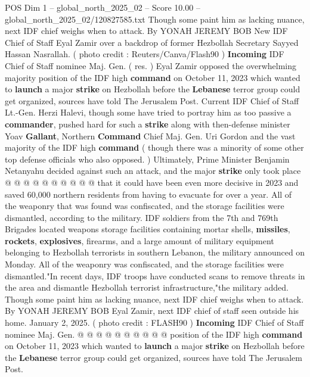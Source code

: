 \begin{textsample}{POS Dim 1 – global\_north\_2025\_02 – Score 10.00 – global\_north\_2025\_02/120827585.txt}  \label{ex:f1_pos_443}
Though some paint him as lacking nuance, next IDF chief weighs when to attack.
By YONAH JEREMY BOB New IDF Chief of Staff Eyal Zamir over a backdrop of former Hezbollah Secretary Sayyed Hassan Nasrallah. ( photo credit : Reuters/Canva/Flash90 ) \textbf{Incoming} IDF Chief of Staff nominee Maj.
Gen. ( res. ) Eyal Zamir opposed the overwhelming majority position of the IDF high \textbf{command} on October 11, 2023 which wanted to \textbf{launch} a major \textbf{strike} on Hezbollah before the \textbf{Lebanese} terror group could get organized, sources have told The Jerusalem Post.
Current IDF Chief of Staff Lt.-Gen.
Herzi Halevi, though some have tried to portray him as too passive a \textbf{commander}, pushed hard for such a \textbf{strike} along with then-defense minister Yoav \textbf{Gallant}, Northern \textbf{Command} Chief Maj.
Gen.
Uri Gordon and the vast majority of the IDF high \textbf{command} ( though there was a minority of some other top defense officials who also opposed. ) Ultimately, Prime Minister Benjamin Netanyahu decided against such an attack, and the major \textbf{strike} only took place @ @ @ @ @ @ @ @ @ @ that it could have been even more decisive in 2023 and saved 60,000 northern residents from having to evacuate for over a year.
All of the weaponry that was found was confiscated, and the storage facilities were dismantled, according to the military.
IDF soldiers from the 7th and 769th Brigades located weapons storage facilities containing mortar shells, \textbf{missiles}, \textbf{rockets}, \textbf{explosives}, firearms, and a large amount of military equipment belonging to Hezbollah terrorists in southern Lebanon, the military announced on Monday.
All of the weaponry was confiscated, and the storage facilities were dismantled."In recent days, IDF troops have conducted scans to remove threats in the area and dismantle Hezbollah terrorist infrastructure,"the military added.
Though some paint him as lacking nuance, next IDF chief weighs when to attack.
By YONAH JEREMY BOB Eyal Zamir, next IDF chief of staff seen outside his home.
January 2, 2025. ( photo credit : FLASH90 ) \textbf{Incoming} IDF Chief of Staff nominee Maj.
Gen. @ @ @ @ @ @ @ @ @ @ position of the IDF high \textbf{command} on October 11, 2023 which wanted to \textbf{launch} a major \textbf{strike} on Hezbollah before the \textbf{Lebanese} terror group could get organized, sources have told The Jerusalem Post.

\end{textsample}
